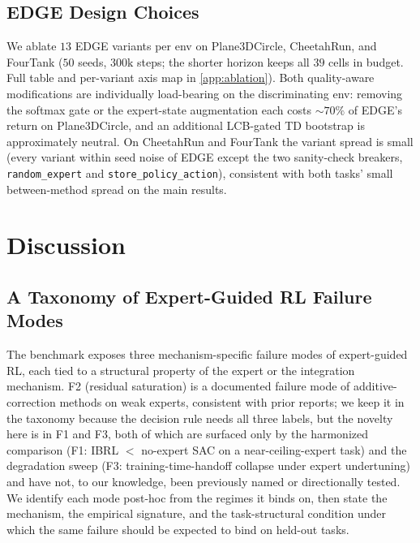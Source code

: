 \documentclass{article}
\begin{document}
\subsection{EDGE Design Choices}
\label{sec:design-ablation}

We ablate $13$ EDGE variants per env on Plane3DCircle, CheetahRun,
and FourTank ($50$ seeds, $300\mathrm{k}$ steps; the shorter
horizon keeps all $39$ cells in budget. Full table and per-variant
axis map in \cref{app:ablation}). Both quality-aware modifications
are individually load-bearing on the discriminating env: removing
the softmax gate or the expert-state augmentation each costs
$\sim$$70\%$ of EDGE's return on Plane3DCircle, and an additional
LCB-gated TD bootstrap is approximately neutral. On CheetahRun and
FourTank the variant spread is small (every variant within seed
noise of EDGE except the two sanity-check breakers,
\texttt{random\_expert} and \texttt{store\_policy\_action}),
consistent with both tasks' small between-method spread on the
main results.

\section{Discussion}
\label{sec:discussion}

\subsection{A Taxonomy of Expert-Guided RL Failure Modes}
\label{sec:failuremodes}

The benchmark exposes three mechanism-specific failure modes of
expert-guided RL, each tied to a structural property of the expert
or the integration mechanism. F2 (residual saturation) is a
documented failure mode of additive-correction methods on weak
experts, consistent with prior reports; we keep it in the taxonomy
because the decision rule needs all three labels, but the novelty
here is in F1 and F3, both
of which are surfaced only by the harmonized comparison (F1: IBRL
$<$ no-expert SAC on a near-ceiling-expert task) and the degradation
sweep (F3: training-time-handoff collapse under expert undertuning) and
have not, to our knowledge, been previously named or directionally
tested. We identify each mode post-hoc from the regimes it binds on,
then state the mechanism, the empirical signature, and the
task-structural condition under which the same failure should be
expected to bind on held-out tasks.
\end{document}
